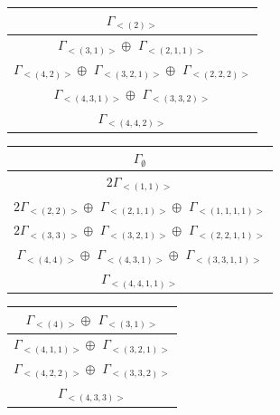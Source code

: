 \begin{minipage}{.35\textwidth}
\centering
\begin{tabular}{|c|}\hline
$\Gamma_{<(
2
)>}$
\\ \hline
$\Gamma_{<(
3 , 
1
)>} \oplus$
$\Gamma_{<(
2 , 
1 , 
1
)>}$
\\ \hline
$\Gamma_{<(
4 , 
2
)>} \oplus$
$\Gamma_{<(
3 , 
2 , 
1
)>} \oplus$
$\Gamma_{<(
2 , 
2 , 
2
)>}$
\\ \hline
$\Gamma_{<(
4 , 
3 , 
1
)>} \oplus$
$\Gamma_{<(
3 , 
3 , 
2
)>}$
\\ \hline
$\Gamma_{<(
4 , 
4 , 
2
)>}$
\\
\hline\end{tabular}\end{minipage}
\begin{minipage}{.45\textwidth}
\centering
\begin{tabular}{|c|}\hline
$\Gamma_\emptyset$
\\ \hline
$ 2 \Gamma_{<(
1 , 
1
)>}$
\\ \hline
$ 2 \Gamma_{<(
2 , 
2
)>} \oplus$
$\Gamma_{<(
2 , 
1 , 
1
)>} \oplus$
$\Gamma_{<(
1 , 
1 , 
1 , 
1
)>}$
\\ \hline
$ 2 \Gamma_{<(
3 , 
3
)>} \oplus$
$\Gamma_{<(
3 , 
2 , 
1
)>} \oplus$
$\Gamma_{<(
2 , 
2 , 
1 , 
1
)>}$
\\ \hline
$\Gamma_{<(
4 , 
4
)>} \oplus$
$\Gamma_{<(
4 , 
3 , 
1
)>} \oplus$
$\Gamma_{<(
3 , 
3 , 
1 , 
1
)>}$
\\ \hline
$\Gamma_{<(
4 , 
4 , 
1 , 
1
)>}$
\\
\hline\end{tabular}\end{minipage}
\bigskip
\begin{minipage}{1\textwidth}
\centering
\begin{tabular}{|c|}\hline
$\Gamma_{<(
4
)>} \oplus$
$\Gamma_{<(
3 , 
1
)>}$
\\ \hline
$\Gamma_{<(
4 , 
1 , 
1
)>} \oplus$
$\Gamma_{<(
3 , 
2 , 
1
)>}$
\\ \hline
$\Gamma_{<(
4 , 
2 , 
2
)>} \oplus$
$\Gamma_{<(
3 , 
3 , 
2
)>}$
\\ \hline
$\Gamma_{<(
4 , 
3 , 
3
)>}$
\\
\hline\end{tabular}\end{minipage}
\bigskip
